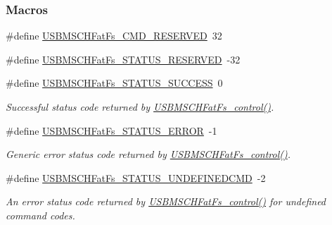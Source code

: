 \subsubsection*{Macros}
\begin{DoxyCompactItemize}
\item 
\#define \hyperlink{group___u_s_b_m_s_c_h_fat_fs___c_o_n_t_r_o_l_gad004ac61340295d4d9b03cf1c2e202c4}{U\+S\+B\+M\+S\+C\+H\+Fat\+Fs\+\_\+\+C\+M\+D\+\_\+\+R\+E\+S\+E\+R\+V\+E\+D}~32
\item 
\#define \hyperlink{group___u_s_b_m_s_c_h_fat_fs___c_o_n_t_r_o_l_ga545b1522b0f10d6215484ade86b5dcc8}{U\+S\+B\+M\+S\+C\+H\+Fat\+Fs\+\_\+\+S\+T\+A\+T\+U\+S\+\_\+\+R\+E\+S\+E\+R\+V\+E\+D}~-\/32
\item 
\#define \hyperlink{group___u_s_b_m_s_c_h_fat_fs___s_t_a_t_u_s_ga40e5ecd349cbaeb9f524b568240822d3}{U\+S\+B\+M\+S\+C\+H\+Fat\+Fs\+\_\+\+S\+T\+A\+T\+U\+S\+\_\+\+S\+U\+C\+C\+E\+S\+S}~0
\begin{DoxyCompactList}\small\item\em Successful status code returned by \hyperlink{_u_s_b_m_s_c_h_fat_fs_8h_a8725aac569cefabe624b5bfda0d07422}{U\+S\+B\+M\+S\+C\+H\+Fat\+Fs\+\_\+control()}. \end{DoxyCompactList}\item 
\#define \hyperlink{group___u_s_b_m_s_c_h_fat_fs___s_t_a_t_u_s_gabf90bd396f6e1caf142983768aafee6d}{U\+S\+B\+M\+S\+C\+H\+Fat\+Fs\+\_\+\+S\+T\+A\+T\+U\+S\+\_\+\+E\+R\+R\+O\+R}~-\/1
\begin{DoxyCompactList}\small\item\em Generic error status code returned by \hyperlink{_u_s_b_m_s_c_h_fat_fs_8h_a8725aac569cefabe624b5bfda0d07422}{U\+S\+B\+M\+S\+C\+H\+Fat\+Fs\+\_\+control()}. \end{DoxyCompactList}\item 
\#define \hyperlink{group___u_s_b_m_s_c_h_fat_fs___s_t_a_t_u_s_ga60260295df38b47e3e58ec29003d52b4}{U\+S\+B\+M\+S\+C\+H\+Fat\+Fs\+\_\+\+S\+T\+A\+T\+U\+S\+\_\+\+U\+N\+D\+E\+F\+I\+N\+E\+D\+C\+M\+D}~-\/2
\begin{DoxyCompactList}\small\item\em An error status code returned by \hyperlink{_u_s_b_m_s_c_h_fat_fs_8h_a8725aac569cefabe624b5bfda0d07422}{U\+S\+B\+M\+S\+C\+H\+Fat\+Fs\+\_\+control()} for undefined command codes. \end{DoxyCompactList}\end{DoxyCompactItemize}
